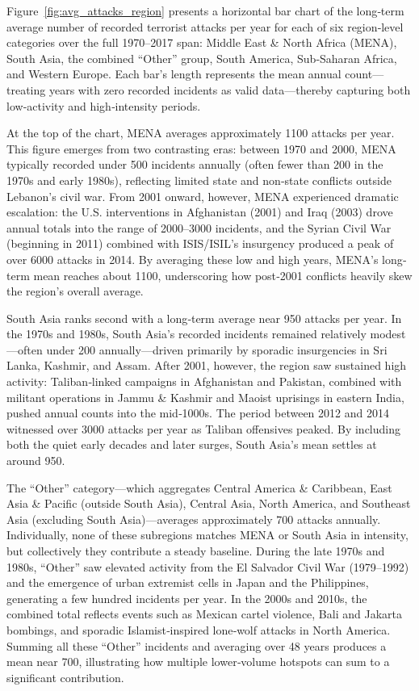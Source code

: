 Figure~\ref{fig:avg_attacks_region} presents a horizontal bar chart of the long‐term average number of recorded terrorist attacks per year for each of six region‐level categories over the full 1970–2017 span: Middle East \& North Africa (MENA), South Asia, the combined “Other” group, South America, Sub‐Saharan Africa, and Western Europe. Each bar’s length represents the mean annual count—treating years with zero recorded incidents as valid data—thereby capturing both low‐activity and high‐intensity periods.

At the top of the chart, MENA averages approximately 1100 attacks per year. This figure emerges from two contrasting eras: between 1970 and 2000, MENA typically recorded under 500 incidents annually (often fewer than 200 in the 1970s and early 1980s), reflecting limited state and non‐state conflicts outside Lebanon’s civil war. From 2001 onward, however, MENA experienced dramatic escalation: the U.S. interventions in Afghanistan (2001) and Iraq (2003) drove annual totals into the range of 2000–3000 incidents, and the Syrian Civil War (beginning in 2011) combined with ISIS/ISIL’s insurgency produced a peak of over 6000 attacks in 2014. By averaging these low and high years, MENA’s long‐term mean reaches about 1100, underscoring how post‐2001 conflicts heavily skew the region’s overall average.

South Asia ranks second with a long‐term average near 950 attacks per year. In the 1970s and 1980s, South Asia’s recorded incidents remained relatively modest—often under 200 annually—driven primarily by sporadic insurgencies in Sri Lanka, Kashmir, and Assam. After 2001, however, the region saw sustained high activity: Taliban‐linked campaigns in Afghanistan and Pakistan, combined with militant operations in Jammu \& Kashmir and Maoist uprisings in eastern India, pushed annual counts into the mid‐1000s. The period between 2012 and 2014 witnessed over 3000 attacks per year as Taliban offensives peaked. By including both the quiet early decades and later surges, South Asia’s mean settles at around 950.

The “Other” category—which aggregates Central America \& Caribbean, East Asia \& Pacific (outside South Asia), Central Asia, North America, and Southeast Asia (excluding South Asia)—averages approximately 700 attacks annually. Individually, none of these subregions matches MENA or South Asia in intensity, but collectively they contribute a steady baseline. During the late 1970s and 1980s, “Other” saw elevated activity from the El Salvador Civil War (1979–1992) and the emergence of urban extremist cells in Japan and the Philippines, generating a few hundred incidents per year. In the 2000s and 2010s, the combined total reflects events such as Mexican cartel violence, Bali and Jakarta bombings, and sporadic Islamist‐inspired lone‐wolf attacks in North America. Summing all these “Other” incidents and averaging over 48 years produces a mean near 700, illustrating how multiple lower‐volume hotspots can sum to a significant contribution.

